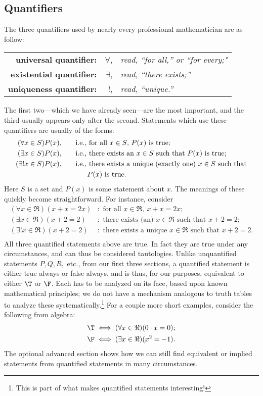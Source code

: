 \subsection{Quantifiers}%
The three quantifiers used by nearly every professional
mathematician are as follow:
\bigskip

\begin{tabular}{rrl} 
{\bf{universal quantifier}: }&$\forall$,  
\qquad&{\it read, ``for all,'' or ``for every;"}\\
{\bf{existential quantifier}: }&$\exists$, 
\qquad&{\it read, ``there exists;''}\\
{\bf{uniqueness quantifier}: }&$!$, \qquad&{\it read, ``unique.''}
\end{tabular} 
\bigskip

\noindent%
The first two---which we have already seen---are the most important, 
and the third usually appears
only after the second.  Statements which use these quantifiers
are usually of the forms:
\begin{align*}
(\forall x\in S)P(x),\qquad&\text{i.e., for all $x\in S$, $P(x)$ is true;}\\
(\exists x\in S)P(x),\qquad&\text{i.e., there exists an $x\in S$ such that 
        $P(x)$ is true;}\\
(\exists!x\in S)P(x),\qquad&\text{i.e., there exists a unique (exactly
one) $x\in S$ such that}\\&\hphantom{i.e., } P(x)\text{\ is true.}
\end{align*} 
Here $S$ is a set and $P(x)$ is some statement about $x$.  
\noindent The meanings of these quickly become straightforward.
For instance, consider
\begin{align*}
(\forall x\in\Re)(x+x=2x)&:\text{ for all }x\in\Re,\ x+x=2x;\\
(\exists x\in\Re)(x+2=2)&:\text{ there exists (an) }x\in\Re
                              \text{ such that }x+2=2;\\
(\exists !x\in\Re)(x+2=2)&:\text{ there exists a unique }x\in\Re
                  \text{ such that }x+2=2.\\
\end{align*}
All three quantified statements above are true.  In fact
they are true under any circumstances, and can thus be considered
tautologies.  Unlike unquantified statements $P,Q,R,$ etc., 
from our first three sections,
a quantified statement is either true always or false always, and
is thus, for our purposes, equivalent to either $\T$ or $\F$.
Each has to be analyzed on its face, 
based upon known mathematical
principles; we do not have a mechanism analogous to
truth tables to analyze these systematically.\footnote{%
This is part of what makes quantified statements interesting!
}
For a couple more short examples, consider the following from algebra:
\begin{align*}
\T&\iff(\forall x\in\Re)(0\cdot x=0);\\
\F&\iff(\exists x\in\Re)(x^2=-1).
\end{align*}
The optional advanced section shows how 
we can still find equivalent or implied statements
from quantified statements in many circumstances.

